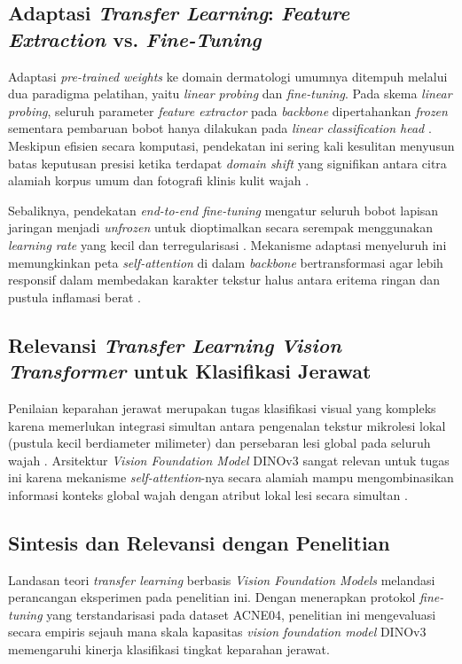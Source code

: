 \subsection{Adaptasi \textit{Transfer Learning}: \textit{Feature Extraction} vs. \textit{Fine-Tuning}}
Adaptasi \textit{pre-trained weights} ke domain dermatologi umumnya ditempuh melalui dua paradigma pelatihan, yaitu \textit{linear probing} dan \textit{fine-tuning}. Pada skema \textit{linear probing}, seluruh parameter \textit{feature extractor} pada \textit{backbone} dipertahankan \textit{frozen} sementara pembaruan bobot hanya dilakukan pada \textit{linear classification head} \cite{davila2024}. Meskipun efisien secara komputasi, pendekatan ini sering kali kesulitan menyusun batas keputusan presisi ketika terdapat \textit{domain shift} yang signifikan antara citra alamiah korpus umum dan fotografi klinis kulit wajah \cite{davila2024}.

Sebaliknya, pendekatan \textit{end-to-end fine-tuning} mengatur seluruh bobot lapisan jaringan menjadi \textit{unfrozen} untuk dioptimalkan secara serempak menggunakan \textit{learning rate} yang kecil dan terregularisasi \cite{davila2024}. Mekanisme adaptasi menyeluruh ini memungkinkan peta \textit{self-attention} di dalam \textit{backbone} bertransformasi agar lebih responsif dalam membedakan karakter tekstur halus antara eritema ringan dan pustula inflamasi berat \cite{zeng2026}.

\subsection{Relevansi \textit{Transfer Learning} \textit{Vision Transformer} untuk Klasifikasi Jerawat}
Penilaian keparahan jerawat merupakan tugas klasifikasi visual yang kompleks karena memerlukan integrasi simultan antara pengenalan tekstur mikrolesi lokal (pustula kecil berdiameter milimeter) dan persebaran lesi global pada seluruh wajah \cite{wu2019, lin2022}. Arsitektur \textit{Vision Foundation Model} DINOv3 sangat relevan untuk tugas ini karena mekanisme \textit{self-attention}-nya secara alamiah mampu mengombinasikan informasi konteks global wajah dengan atribut lokal lesi secara simultan \cite{simeoni2025dinov3}.

\subsection{Sintesis dan Relevansi dengan Penelitian}
Landasan teori \textit{transfer learning} berbasis \textit{Vision Foundation Models} melandasi perancangan eksperimen pada penelitian ini. Dengan menerapkan protokol \textit{fine-tuning} yang terstandarisasi pada dataset ACNE04, penelitian ini mengevaluasi secara empiris sejauh mana skala kapasitas \textit{vision foundation model} DINOv3 memengaruhi kinerja klasifikasi tingkat keparahan jerawat.

